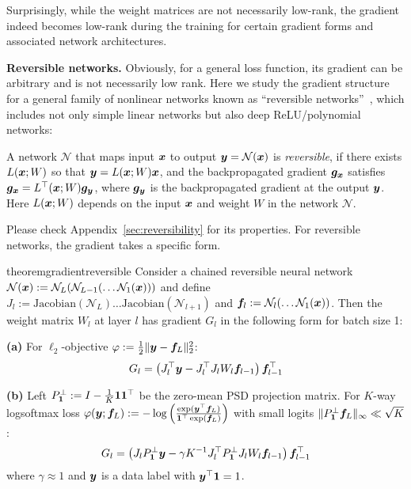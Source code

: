 \def\beig{\lambda}
\def\ceig{\nu}

\def\bmin{\underline{\beig}}
\def\cmin{\underline{\ceig}}

\def\cN{\mathcal{N}}

Surprisingly, while the weight matrices are not necessarily low-rank, the gradient indeed becomes low-rank during the training for certain gradient forms and associated network architectures. 

\textbf{Reversible networks.} Obviously, for a general loss function, its gradient can be arbitrary and is not necessarily low rank. Here we study the gradient structure for a general family of nonlinear networks known as ``reversible networks''~\cite{tian2020understanding}, which includes not only simple linear networks but also deep ReLU/polynomial networks:

\begin{definition}
A network $\cN$ that maps input ${\bm{x}}$ to output $\vy = \cN(\vx)$ is \emph{reversible}, if there exists $L({\bm{x}}; W)$ so that ${\bm{y}}= L({\bm{x}}; W){\bm{x}}$, and the backpropagated gradient ${\bm{g}}_{\bm{x}}$ satisfies ${\bm{g}}_{\bm{x}} = L^\top({\bm{x}}; W) {\bm{g}}_{\bm{y}}$, where ${\bm{g}}_{\bm{y}}$ is the backpropagated gradient at the output ${\bm{y}}$. Here $L({\bm{x}};W)$ depends on the input ${\bm{x}}$ and weight $W$ in the network $\cN$. 
\end{definition}

Please check Appendix~\ref{sec:reversibility} for its properties. For reversible networks, the gradient takes a specific form. 

\begin{restatable}{theorem}{gradientreversible}
\label{thm:gradientreversible}
Consider a chained reversible neural network $\cN(\vx) := \cN_L(\cN_{L-1}(\ldots\cN_1(\vx)))$ and define $J_l := \mathrm{Jacobian}(\cN_L) \ldots \mathrm{Jacobian}(\cN_{l+1})$ and $\vf_l := \cN_l(\ldots \cN_1(\vx))$. Then the weight matrix $W_l$ at layer $l$ has gradient $G_l$ in the following form for batch size 1:  

\textbf{(a)} For $\ell_2$-objective $\varphi := \frac12\|{\bm{y}} - {\bm{f}}_L\|_2^2$: 
\begin{equation}
    G_l = \left(J_l^\top {\bm{y}} - J^\top_l J_l W_l {\bm{f}}_{l-1}\right){\bm{f}}_{l-1}^\top \label{eq:reversible-grad}
\end{equation}

\textbf{(b)} Left $P^\perp_{\bm{1}} := I - \frac{1}{K}{\bm{1}}{\bm{1}}^\top$ be the zero-mean PSD projection matrix. For $K$-way logsoftmax loss $\varphi({\bm{y}}; {\bm{f}}_L) := -\log \left( \frac{\exp({\bm{y}}^\top {\bm{f}}_L)}{{\bm{1}}^\top \exp({\bm{f}}_L)}\right)$ with small logits $\|P^\perp_{\bm{1}}{\bm{f}}_L\|_\infty \ll \sqrt{K}$: 
\begin{equation}
    G_l = \left(J_lP^\perp_{\bm{1}} {\bm{y}} - \gamma K^{-1}J_l^\top P^\perp_{\bm{1}} J_l W_l {\bm{f}}_{l-1}\right){\bm{f}}_{l-1}^\top
\end{equation}
where $\gamma \approx 1$ and ${\bm{y}}$ is a data label with ${\bm{y}}^\top {\bm{1}} = 1$.
\end{restatable}

